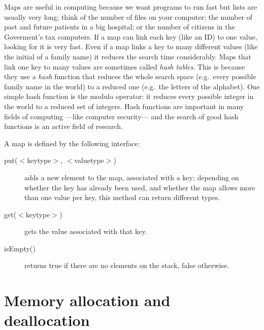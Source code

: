 Maps are useful in computing because we want programs to run fast but
lists are usually very long; think of the number of files on your
computer; the number of past and future patients in a big hospital; or
the number of citizens in the Goverment's tax computers. If a map can
link each key (like an ID) to one value, looking for it is very
fast. Even if a map links a key to many different values (like the
initial of a family name) it reduces the search time
considerably. Maps that link one key to many values are sometimes
called \emph{hash tables}. This is because they use a \emph{hash}
function that reduces the whole search space (e.g.~every possible
family name in the world) to a reduced one (e.g.~the letters of the
alphabet). One simple hash function is the modulo operator: it reduces
every possible integer in the world to a reduced set of integers. Hash
functions are important in many fields of computing ---like computer
security--- and the search of good hash functions is an active field of
research. 

A map is defined by the following interface: 

\begin{description}
\item[put($<$keytype$>$, $<$valuetype$>$)] adds a new element to the
  map, associated with a key; depending on whether the key has already
  been used, and whether the map allows more than one value per key,
  this method can return different types. 
\item[get($<$keytype$>$) ] gets the value associated with that key.
\item[isEmpty() ] returns true if there are no elements on the stack,
  false otherwise.
\end{description}

\section{Memory allocation and deallocation}
\label{sec:memory-alloc-deall}






